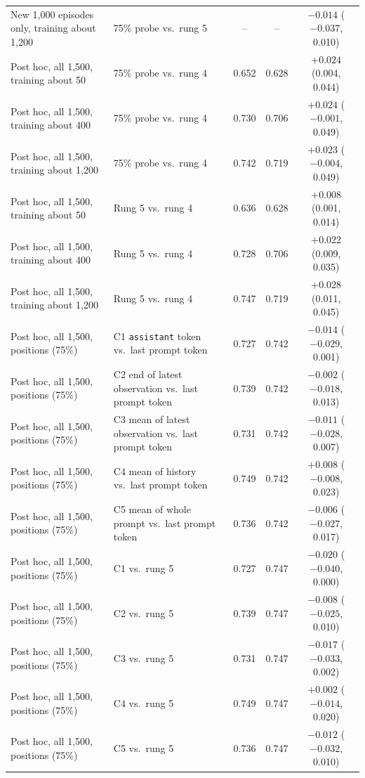 \begin{table}[htbp]
\begin{tabularx}{\linewidth}{@{}LLccc@{}}
New 1,000 episodes only, training about 1,200 & 75\% probe vs.\ rung 5 & -- & -- & $-0.014$ ($-0.037$, 0.010) \\
Post hoc, all 1,500, training about 50 & 75\% probe vs.\ rung 4 & 0.652 & 0.628 & $+0.024$ (0.004, 0.044) \\
Post hoc, all 1,500, training about 400 & 75\% probe vs.\ rung 4 & 0.730 & 0.706 & $+0.024$ ($-0.001$, 0.049) \\
Post hoc, all 1,500, training about 1,200 & 75\% probe vs.\ rung 4 & 0.742 & 0.719 & $+0.023$ ($-0.004$, 0.049) \\
Post hoc, all 1,500, training about 50 & Rung 5 vs.\ rung 4 & 0.636 & 0.628 & $+0.008$ (0.001, 0.014) \\
Post hoc, all 1,500, training about 400 & Rung 5 vs.\ rung 4 & 0.728 & 0.706 & $+0.022$ (0.009, 0.035) \\
Post hoc, all 1,500, training about 1,200 & Rung 5 vs.\ rung 4 & 0.747 & 0.719 & $+0.028$ (0.011, 0.045) \\
Post hoc, all 1,500, positions (75\%) & C1 \texttt{assistant} token vs.\ last prompt token & 0.727 & 0.742 & $-0.014$ ($-0.029$, 0.001) \\
Post hoc, all 1,500, positions (75\%) & C2 end of latest observation vs.\ last prompt token & 0.739 & 0.742 & $-0.002$ ($-0.018$, 0.013) \\
Post hoc, all 1,500, positions (75\%) & C3 mean of latest observation vs.\ last prompt token & 0.731 & 0.742 & $-0.011$ ($-0.028$, 0.007) \\
Post hoc, all 1,500, positions (75\%) & C4 mean of history vs.\ last prompt token & 0.749 & 0.742 & $+0.008$ ($-0.008$, 0.023) \\
Post hoc, all 1,500, positions (75\%) & C5 mean of whole prompt vs.\ last prompt token & 0.736 & 0.742 & $-0.006$ ($-0.027$, 0.017) \\
Post hoc, all 1,500, positions (75\%) & C1 vs.\ rung 5 & 0.727 & 0.747 & $-0.020$ ($-0.040$, 0.000) \\
Post hoc, all 1,500, positions (75\%) & C2 vs.\ rung 5 & 0.739 & 0.747 & $-0.008$ ($-0.025$, 0.010) \\
Post hoc, all 1,500, positions (75\%) & C3 vs.\ rung 5 & 0.731 & 0.747 & $-0.017$ ($-0.033$, 0.002) \\
Post hoc, all 1,500, positions (75\%) & C4 vs.\ rung 5 & 0.749 & 0.747 & $+0.002$ ($-0.014$, 0.020) \\
Post hoc, all 1,500, positions (75\%) & C5 vs.\ rung 5 & 0.736 & 0.747 & $-0.012$ ($-0.032$, 0.010) \\

\end{tabularx}
\end{table}
